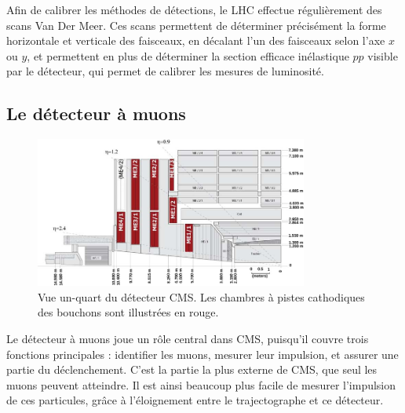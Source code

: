 Afin de calibrer les méthodes de détections, le LHC effectue régulièrement des scans Van Der Meer. Ces scans permettent de déterminer précisément la forme horizontale et verticale des faisceaux, en décalant l'un des faisceaux selon l'axe $x$ ou $y$, et permettent en plus de déterminer la section efficace inélastique $pp$ visible par le détecteur, qui permet de calibrer les mesures de luminosité.

\subsection{Le détecteur à muons}

\begin{figure}[tb] \centering
  \includegraphics[width=0.8\textwidth]{chapitre2/figs/CSC.pdf}
  \caption{Vue un-quart du détecteur CMS. Les chambres à pistes cathodiques des bouchons sont illustrées en rouge.}
  \label{fig:cms_csc}
\end{figure}


Le détecteur à muons joue un rôle central dans CMS, puisqu'il couvre trois fonctions principales : identifier les muons, mesurer leur impulsion, et assurer une partie du déclenchement. C'est la partie la plus externe de CMS, que seul les muons peuvent atteindre. Il est ainsi beaucoup plus facile de mesurer l'impulsion de ces particules, grâce à l'éloignement entre le trajectographe et ce détecteur.

